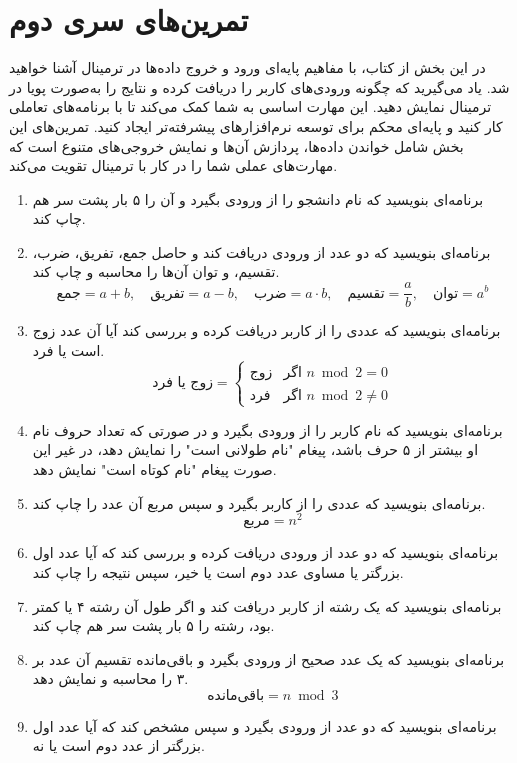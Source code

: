 \documentclass[b5paper,12pt]{article}
\begin{document}
	\newpage
	\section*{تمرین‌های سری دوم}
	در این بخش از کتاب، با مفاهیم پایه‌ای ورود و خروج داده‌ها در ترمینال آشنا خواهید شد. یاد می‌گیرید که چگونه ورودی‌های کاربر را دریافت کرده و نتایج را به‌صورت پویا در ترمینال نمایش دهید. این مهارت اساسی به شما کمک می‌کند تا با برنامه‌های تعاملی کار کنید و پایه‌ای محکم برای توسعه نرم‌افزارهای پیشرفته‌تر ایجاد کنید. تمرین‌های این بخش شامل خواندن داده‌ها، پردازش آن‌ها و نمایش خروجی‌های متنوع است که مهارت‌های عملی شما را در کار با ترمینال تقویت می‌کند.

	\begin{enumerate}
		
		\item برنامه‌ای بنویسید که نام دانشجو را از ورودی بگیرد و آن را ۵ بار پشت سر هم چاپ کند.
		\item برنامه‌ای بنویسید که دو عدد از ورودی دریافت کند و حاصل جمع، تفریق، ضرب، تقسیم، و توان آن‌ها را محاسبه و چاپ کند.
		\[ 
		\text{جمع} = a + b, \quad 
		\text{تفریق} = a - b, \quad 
		\text{ضرب} = a \cdot b, \quad 
		\text{تقسیم} = \frac{a}{b}, \quad 
		\text{توان} = a^b
		\]
		\item برنامه‌ای بنویسید که عددی را از کاربر دریافت کرده و بررسی کند آیا آن عدد زوج است یا فرد.
		\[ 
		\text{زوج یا فرد} = 
		\begin{cases} 
			\text{زوج} & \text{اگر } n \bmod 2 = 0 \\ 
			\text{فرد} & \text{اگر } n \bmod 2 \neq 0 
		\end{cases} 
		\]
		\item برنامه‌ای بنویسید که نام کاربر را از ورودی بگیرد و در صورتی که تعداد حروف نام او بیشتر از ۵ حرف باشد، پیغام "نام طولانی است" را نمایش دهد، در غیر این صورت پیغام "نام کوتاه است" نمایش دهد.
		\item برنامه‌ای بنویسید که عددی را از کاربر بگیرد و سپس مربع آن عدد را چاپ کند.
		\[ 
		\text{مربع} = n^2 
		\]
		\item برنامه‌ای بنویسید که دو عدد از ورودی دریافت کرده و بررسی کند که آیا عدد اول بزرگتر یا مساوی عدد دوم است یا خیر، سپس نتیجه را چاپ کند.
		\item برنامه‌ای بنویسید که یک رشته از کاربر دریافت کند و اگر طول آن رشته ۴ یا کمتر بود، رشته را ۵ بار پشت سر هم چاپ کند.
		\item برنامه‌ای بنویسید که یک عدد صحیح از ورودی بگیرد و باقی‌مانده تقسیم آن عدد بر ۳ را محاسبه و نمایش دهد.
		\[ 
		\text{باقی‌مانده} = n \bmod 3 
		\]
		\item برنامه‌ای بنویسید که دو عدد از ورودی بگیرد و سپس مشخص کند که آیا عدد اول بزرگتر از عدد دوم است یا نه.

\end{enumerate}
\end{document}
